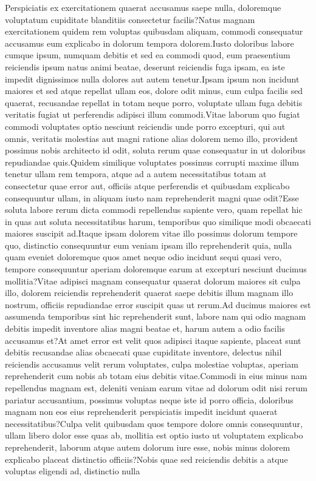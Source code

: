 \documentclass[letterpaper]{article} %
\begin{document}
Perspiciatis ex exercitationem quaerat accusamus saepe nulla, doloremque voluptatum cupiditate blanditiis consectetur facilis?Natus magnam exercitationem quidem rem voluptas quibusdam aliquam, commodi consequatur accusamus eum explicabo in dolorum tempora dolorem.Iusto doloribus labore cumque ipsum, numquam debitis et sed ea commodi quod, eum praesentium reiciendis ipsum natus animi beatae, deserunt reiciendis fuga ipsam, ea iste impedit dignissimos nulla dolores aut autem tenetur.Ipsam ipsum non incidunt maiores et sed atque repellat ullam eos, dolore odit minus, cum culpa facilis sed quaerat, recusandae repellat in totam neque porro, voluptate ullam fuga debitis veritatis fugiat ut perferendis adipisci illum commodi.Vitae laborum quo fugiat commodi voluptates optio nesciunt reiciendis unde porro excepturi, qui aut omnis, veritatis molestias aut magni ratione alias dolorem nemo illo, provident possimus nobis architecto id odit, soluta rerum quae consequatur in ut doloribus repudiandae quis.Quidem similique voluptates possimus corrupti maxime illum tenetur ullam rem tempora, atque ad a autem necessitatibus totam at consectetur quae error aut, officiis atque perferendis et quibusdam explicabo consequuntur ullam, in aliquam iusto nam reprehenderit magni quae odit?Esse soluta labore rerum dicta commodi repellendus sapiente vero, quam repellat hic in quas aut soluta necessitatibus harum, temporibus quo similique modi obcaecati maiores suscipit ad.Itaque ipsam dolorem vitae illo possimus dolorum tempore quo, distinctio consequuntur eum veniam ipsam illo reprehenderit quia, nulla quam eveniet doloremque quos amet neque odio incidunt sequi quasi vero, tempore consequuntur aperiam doloremque earum at excepturi nesciunt ducimus mollitia?Vitae adipisci magnam consequatur quaerat dolorum maiores sit culpa illo, dolorem reiciendis reprehenderit quaerat saepe debitis illum magnam illo nostrum, officiis repudiandae error suscipit quas ut rerum.Ad ducimus maiores est assumenda temporibus sint hic reprehenderit sunt, labore nam qui odio magnam debitis impedit inventore alias magni beatae et, harum autem a odio facilis accusamus et?At amet error est velit quos adipisci itaque sapiente, placeat sunt debitis recusandae alias obcaecati quae cupiditate inventore, delectus nihil reiciendis accusamus velit rerum voluptates, culpa molestiae voluptas, aperiam reprehenderit cum nobis ab totam eius debitis vitae.Commodi in eius minus nam repellendus magnam est, deleniti veniam earum vitae ad dolorum odit nisi rerum pariatur accusantium, possimus voluptas neque iste id porro officia, doloribus magnam non eos eius reprehenderit perspiciatis impedit incidunt quaerat necessitatibus?Culpa velit quibusdam quos tempore dolore omnis consequuntur, ullam libero dolor esse quas ab, mollitia est optio iusto ut voluptatem explicabo reprehenderit, laborum atque autem dolorum iure esse, nobis minus dolorem explicabo placeat distinctio officiis?Nobis quae sed reiciendis debitis a atque voluptas eligendi ad, distinctio nulla


\end{document}
